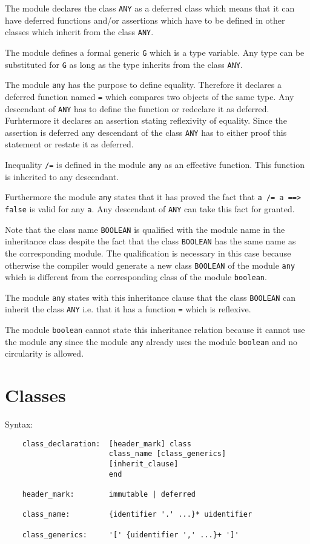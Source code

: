 The module declares the class \lstinline!ANY! as a deferred class which means
that it can have deferred functions and/or assertions which have to be defined
in other classes which inherit from the class \lstinline!ANY!.

The module defines a formal generic \lstinline!G! which is a type
variable. Any type can be substituted for \lstinline!G! as long as the type
inherits from the class \lstinline!ANY!.

The module \lstinline!any! has the purpose to define equality. Therefore it
declares a deferred function named \lstinline!=! which compares two objects of
the same type. Any descendant of \lstinline!ANY! has to define the function or
redeclare it as deferred. Furhtermore it declares an assertion stating
reflexivity of equality. Since the assertion is deferred any descendant of the
class \lstinline!ANY!  has to either proof this statement or restate it as
deferred.

Inequality \lstinline!/=! is defined in the module \lstinline!any! as an
effective function. This function is inherited to any descendant.

Furthermore the module \lstinline!any! states that it has proved the fact
that \lstinline!a /= a ==>! \lstinline!false! is valid for any \lstinline!a!. Any
descendant of \lstinline!ANY! can take this fact for granted.

Note that the class name \lstinline!BOOLEAN! is qualified with the module name
in the inheritance class despite the fact that the class \lstinline!BOOLEAN!
has the same name as the corresponding module. The qualification is necessary
in this case because otherwise the compiler would generate a new class
\lstinline!BOOLEAN! of the module \lstinline!any! which is different from the
corresponding class of the module \lstinline!boolean!.

The module \lstinline!any! states with this inheritance clause that the class
\lstinline!BOOLEAN! can inherit the class \lstinline!ANY! i.e. that it has a
function \lstinline!=! which is reflexive.

The module \lstinline!boolean! cannot state this inheritance relation because
it cannot use the module \lstinline!any! since the module \lstinline!any!
already uses the module \lstinline!boolean!  and no circularity is allowed.



\section{Classes}
%
\noindent Syntax:
\begin{lstlisting}
    class_declaration:  [header_mark] class
                        class_name [class_generics]
                        [inherit_clause]
                        end

    header_mark:        immutable | deferred

    class_name:         {identifier '.' ...}* uidentifier

    class_generics:     '[' {uidentifier ',' ...}+ ']'
\end{lstlisting}


